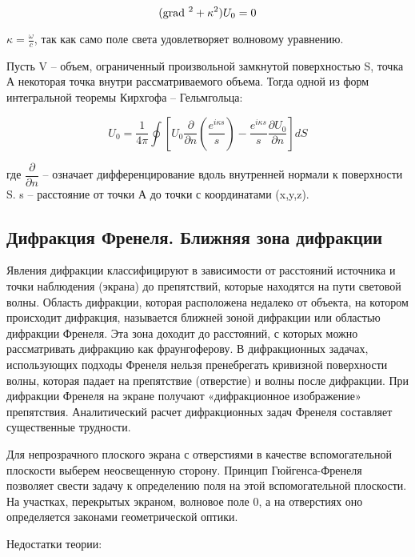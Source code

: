 \begin{equation*}
	(\mathop{\mathrm{grad}}\nolimits\,^2+\kappa^2)U_0=0
\end{equation*}

$\kappa=\frac{\omega}{c}$, так как само поле света удовлетворяет волновому уравнению.

Пусть V – объем, ограниченный произвольной замкнутой поверхностью S, точка А некоторая точка внутри рассматриваемого объема. Тогда одной из форм интегральной теоремы Кирхгофа – Гельмгольца:

\begin{equation*}
	U_0=\frac{1}{4\pi}\oint[{U_0\frac{\partial }{\partial n}(\frac{e^{i\kappa s}}{s})-\frac{e^{i\kappa s}}{s}\frac{\partial U_0}{\partial n}}]dS
\end{equation*}

где $\dfrac{\partial}{\partial n}$ – означает дифференцирование вдоль внутренней нормали к поверхности S. s – расстояние от точки А до точки с координатами (x,y,z).

\subsection{Дифракция Френеля. Ближняя зона дифракции}

Явления дифракции классифицируют в зависимости от расстояний источника и точки наблюдения (экрана) до препятствий, которые находятся на пути световой волны. Область дифракции, которая расположена недалеко от объекта, на котором происходит дифракция, называется ближней зоной дифракции или областью дифракции Френеля. Эта зона доходит до расстояний, с которых можно рассматривать дифракцию как фраунгоферову. В дифракционных задачах, использующих подходы Френеля нельзя пренебрегать кривизной поверхности волны, которая падает на препятствие (отверстие) и волны после дифракции. При дифракции Френеля на экране получают «дифракционное изображение» препятствия. Аналитический расчет дифракционных задач Френеля составляет существенные трудности.

 Для непрозрачного плоского экрана с отверстиями в качестве вспомогательной плоскости выберем неосвещенную сторону. Принцип Гюйгенса-Френеля позволяет свести задачу к определению поля на этой вспомогательной плоскости. На участках, перекрытых экраном, волновое поле 0, а на отверстиях оно определяется законами геометрической оптики. 

Недостатки теории:

